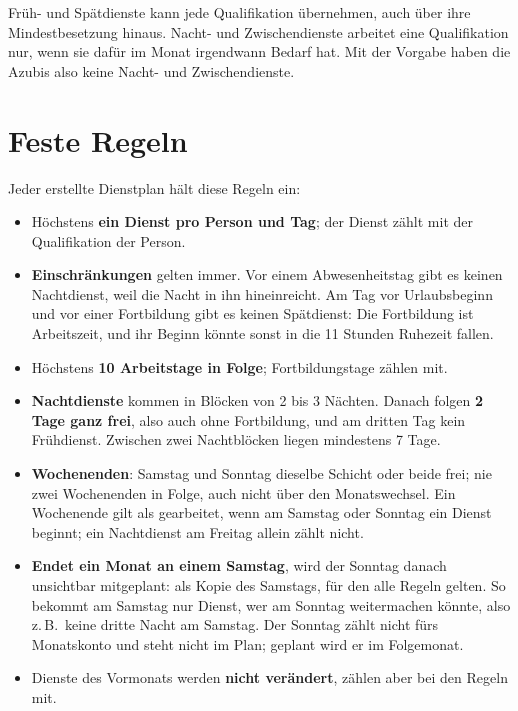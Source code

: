 \documentclass[11pt]{combiArticle}
\begin{document}
Früh- und Spätdienste kann jede Qualifikation übernehmen, auch über ihre Mindestbesetzung hinaus. Nacht- und
Zwischendienste arbeitet eine Qualifikation nur, wenn sie dafür im Monat irgendwann Bedarf hat. Mit der Vorgabe
haben die Azubis also keine Nacht- und Zwischendienste.

\section{Feste Regeln}\label{sec:regeln}

Jeder erstellte Dienstplan hält diese Regeln ein:
\begin{itemize}
  \item Höchstens \textbf{ein Dienst pro Person und Tag}; der Dienst zählt mit der Qualifikation der Person.
  \item \textbf{Einschränkungen} gelten immer. Vor einem Abwesenheitstag gibt es keinen Nachtdienst, weil die
        Nacht in ihn hineinreicht. Am Tag vor Urlaubsbeginn und vor einer Fortbildung gibt es keinen Spätdienst:
        Die Fortbildung ist Arbeitszeit, und ihr Beginn könnte sonst in die 11 Stunden Ruhezeit fallen.
  \item Höchstens \textbf{10 Arbeitstage in Folge}; Fortbildungstage zählen mit.
  \item \textbf{Nachtdienste} kommen in Blöcken von 2 bis 3 Nächten. Danach folgen \textbf{2 Tage ganz frei}, also
        auch ohne Fortbildung, und am dritten Tag kein Frühdienst. Zwischen zwei Nachtblöcken liegen mindestens
        7 Tage.
  \item \textbf{Wochenenden}: Samstag und Sonntag dieselbe Schicht oder beide frei; nie zwei Wochenenden in Folge,
        auch nicht über den Monatswechsel. Ein Wochenende gilt als gearbeitet, wenn am Samstag oder Sonntag ein
        Dienst beginnt; ein Nachtdienst am Freitag allein zählt nicht.
  \item \textbf{Endet ein Monat an einem Samstag}, wird der Sonntag danach unsichtbar mitgeplant: als Kopie des
        Samstags, für den alle Regeln gelten. So bekommt am Samstag nur Dienst, wer am Sonntag weitermachen könnte,
        also z.\,B.\ keine dritte Nacht am Samstag. Der Sonntag zählt nicht fürs Monatskonto und steht nicht im Plan;
        geplant wird er im Folgemonat.
  \item Dienste des Vormonats werden \textbf{nicht verändert}, zählen aber bei den Regeln mit.
\end{itemize}
\end{document}
